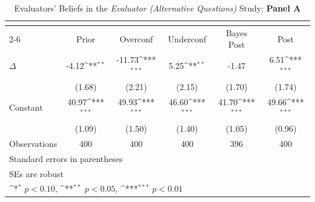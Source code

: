 \begin{table}[htbp]\centering
\def\sym#1{\ifmmode^{#1}\else\(^{#1}\)\fi}
\caption{Evaluators' Beliefs in the \textit{Evaluator (Alternative Questions)} Study: \textbf{Panel A}}
\begin{tabular}{l*{5}{c}}
\hline\hline
                &\multicolumn{5}{c}{}                                                                          \\\cmidrule(lr){2-6}
                &\multicolumn{1}{c}{Prior}&\multicolumn{1}{c}{Overconf}&\multicolumn{1}{c}{Underconf}&\multicolumn{1}{c}{Bayes Post}&\multicolumn{1}{c}{Post}\\
\hline
$\Delta$        &    -4.12\sym{**} &   -11.73\sym{***}&     5.25\sym{**} &    -1.47         &     6.51\sym{***}\\
                &   (1.68)         &   (2.21)         &   (2.15)         &   (1.70)         &   (1.74)         \\
Constant        &    40.97\sym{***}&    49.93\sym{***}&    46.60\sym{***}&    41.70\sym{***}&    49.66\sym{***}\\
                &   (1.09)         &   (1.50)         &   (1.40)         &   (1.05)         &   (0.96)         \\
\hline
Observations    &      400         &      400         &      400         &      396         &      400         \\
\hline\hline
\multicolumn{6}{l}{\footnotesize Standard errors in parentheses}\\
\multicolumn{6}{l}{\footnotesize SEs are robust}\\
\multicolumn{6}{l}{\footnotesize \sym{*} \(p<0.10\), \sym{**} \(p<0.05\), \sym{***} \(p<0.01\)}\\
\end{tabular}
\end{table}
